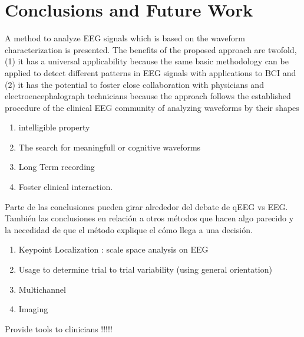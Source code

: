 \chapter{Conclusions and Future Work}
\label{chapter:seven}
A method to analyze EEG signals which is based on the waveform characterization is presented. The benefits of the proposed approach are twofold, (1) it has a universal applicability because the same basic methodology can be applied to detect different patterns in EEG signals with applications to BCI and (2) it has the potential to foster close collaboration with physicians and electroencephalograph technicians because the approach follows the established procedure of the clinical EEG community of analyzing waveforms by their shapes



\begin{enumerate}
\item intelligible property
\item The search for meaningfull or cognitive waveforms
\item Long Term recording
\item Foster clinical interaction.
\end{enumerate}

Parte de las conclusiones pueden girar alrededor del debate de qEEG vs EEG.  También las conclusiones en relación a otros métodos que hacen algo parecido y la necedidad de que el método explique el cómo llega a una decisión.


%
\begin{enumerate}
\item Keypoint Localization : scale space analysis on EEG
\item Usage to determine trial to trial variability (using general orientation)
\item Multichannel
\item Imaging
\end{enumerate}


Provide tools to clinicians !!!!!